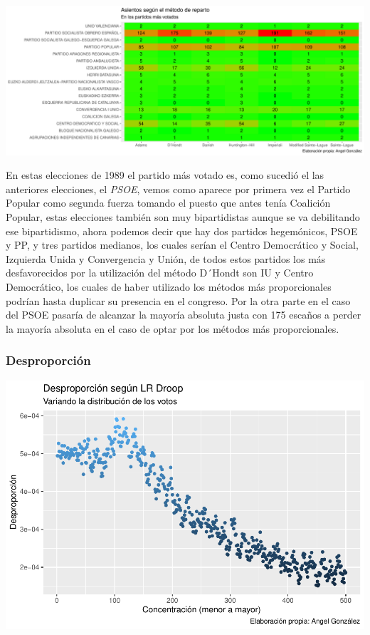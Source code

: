 \documentclass[12pt,a4paper,]{book}
\numberwithin{dummy}{section}
\theoremstyle{ocrenumbox}
\theoremstyle{blacknumex}
\theoremstyle{blacknumbox}
\theoremstyle{ocrenum}
\theoremstyle{ocrenum}
\begin{document}
\begin{center}\includegraphics[width=0.95\linewidth]{figurasR/unnamed-chunk-47-2} \end{center}

En estas elecciones de 1989 el partido más votado es, como sucedió el
las anteriores elecciones, el \emph{PSOE}, vemos como aparece por
primera vez el Partido Popular como segunda fuerza tomando el puesto que
antes tenía Coalición Popular, estas elecciones también son muy
bipartidistas aunque se va debilitando ese bipartidismo, ahora podemos
decir que hay dos partidos hegemónicos, PSOE y PP, y tres partidos
medianos, los cuales serían el Centro Democrático y Social, Izquierda
Unida y Convergencia y Unión, de todos estos partidos los más
desfavorecidos por la utilización del método D´Hondt son IU y Centro
Democrático, los cuales de haber utilizado los métodos más
proporcionales podrían hasta duplicar su presencia en el congreso. Por
la otra parte en el caso del PSOE pasaría de alcanzar la mayoría
absoluta justa con 175 escaños a perder la mayoría absoluta en el caso
de optar por los métodos más proporcionales.

\hypertarget{desproporciuxf3n-4}{%
\subsubsection{Desproporción}\label{desproporciuxf3n-4}}

\begin{center}\includegraphics[width=0.95\linewidth]{figurasR/unnamed-chunk-48-1} \end{center}
\end{document}
